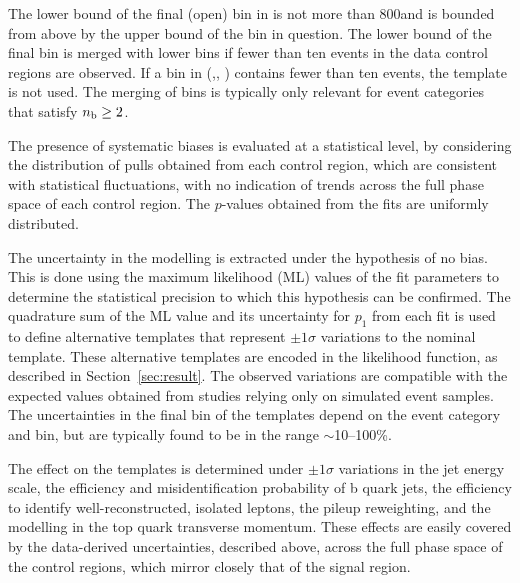The lower bound of the final (open) bin in \HTmiss is not more than
800\GeV and is bounded from above by the upper bound of the \scalht
bin in question. The lower bound of the final \HTmiss bin is merged
with lower bins if fewer than ten events in the data control regions
are observed. If a bin in (\njet,\nb, \scalht) contains fewer than ten
events, the \HTmiss template is not used. The merging of bins is
typically only relevant for event categories that satisfy $n_{\text{b}} \geq
2$.

The presence of systematic biases is evaluated at a statistical level,
by considering the distribution of pulls obtained from each control
region, which are consistent with statistical fluctuations, with no
indication of trends across the full phase space of each control
region. The $p$-values obtained from the fits are uniformly
distributed.

The uncertainty in the \HTmiss modelling is extracted under the
hypothesis of no bias. This is done using the maximum likelihood (ML)
values of the fit parameters to determine the statistical precision to
which this hypothesis can be confirmed. The quadrature sum of the ML
value and its uncertainty for $p_1$ from each fit is used to define
alternative templates that represent $\pm1\sigma$ variations to the
nominal \HTmiss template. These alternative templates are encoded in
the likelihood function, as described in Section~\ref{sec:result}. The
observed variations are compatible with the expected values obtained
from studies relying only on simulated event samples. The
uncertainties in the final \HTmiss bin of the templates depend on the
event category and \scalht bin, but are typically found to be in the
range $\sim$10--100\%.

The effect on the \HTmiss templates is determined under $\pm1\sigma$
variations in the jet energy scale, the efficiency and
misidentification probability of b quark jets, the efficiency to
identify well-reconstructed, isolated leptons, the pileup reweighting,
and the modelling in the top quark transverse momentum. These effects
are easily covered by the data-derived uncertainties, described above,
across the full phase space of the control regions, which mirror
closely that of the signal region.





